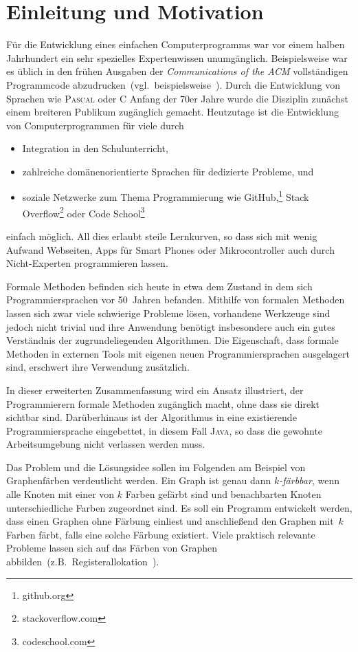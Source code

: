 \documentclass[a4paper,fontsize=12pt,headings=small,captions=tableheading,%
numbers=endperiod,abstracton,pdftex]{scrartcl}
\begin{document}
\section{Einleitung und Motivation}
Für die Entwicklung eines einfachen Computerprogramms war vor einem halben
Jahrhundert ein sehr spezielles Expertenwissen unumgänglich.  Beispielsweise war
es üblich in den frühen Ausgaben der \textsl{Communications of the ACM}
vollständigen Programmcode abzudrucken~(vgl.~beispielsweise~\cite{Gib:75}).
Durch die Entwicklung von Sprachen wie \textsc{Pascal} oder \textsc{C} Anfang
der 70er Jahre wurde die Disziplin zunächst einem breiteren Publikum zugänglich
gemacht.  Heutzutage ist die Entwicklung von Computerprogrammen für viele
durch
\begin{itemize}
\item Integration in den Schulunterricht,
\item zahlreiche domänenorientierte Sprachen für dedizierte Probleme, und
\item soziale Netzwerke zum Thema Programmierung wie
  GitHub,\footnote{github.org} Stack Overflow\footnote{stackoverflow.com} oder
  Code School\footnote{codeschool.com}
\end{itemize}
einfach möglich.  All dies erlaubt steile Lernkurven, so dass sich mit wenig
Aufwand Webseiten, Apps für Smart Phones oder Mikrocontroller auch durch
Nicht-Experten programmieren lassen.

Formale Methoden befinden sich heute in etwa dem Zustand in dem sich
Programmiersprachen vor 50~Jahren befanden.  Mithilfe von formalen Methoden
lassen sich zwar viele schwierige Probleme lösen, vorhandene Werkzeuge sind
jedoch nicht trivial und ihre Anwendung benötigt insbesondere auch ein gutes
Verständnis der zugrundeliegenden Algorithmen.  Die Eigenschaft, dass formale
Methoden in externen Tools mit eigenen neuen Programmiersprachen ausgelagert
sind, erschwert ihre Verwendung zusätzlich.

In dieser erweiterten Zusammenfassung wird ein Ansatz illustriert, der
Programmierern formale Methoden zugänglich macht, ohne dass sie direkt sichtbar
sind.  Darüberhinaus ist der Algorithmus in eine existierende Programmiersprache
eingebettet, in diesem Fall \textsc{Java}, so dass die gewohnte Arbeitsumgebung
nicht verlassen werden muss.

Das Problem und die Lösungsidee sollen im Folgenden am Beispiel von
Graphenfärben verdeutlicht werden.  Ein Graph ist genau dann \emph{$k$-färbbar},
wenn alle Knoten mit einer von $k$ Farben gefärbt sind und benachbarten Knoten
unterschiedliche Farben zugeordnet sind.  Es soll ein Programm entwickelt
werden, dass einen Graphen ohne Färbung einliest und anschließend den Graphen
mit~$k$ Farben färbt, falls eine solche Färbung existiert.  Viele praktisch
relevante Probleme lassen sich auf das Färben von Graphen
abbilden~(z.B.~Registerallokation~\cite{CAC+:81}).
\end{document}
